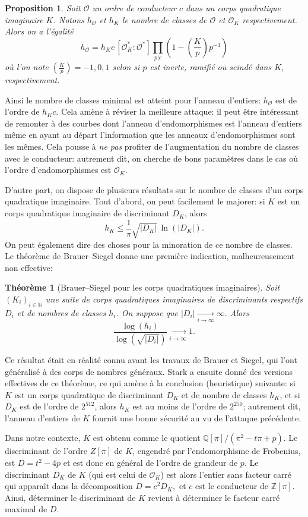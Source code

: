 \documentclass[11pt,a4paper]{article}
\newcommand{\Z}{\mathbb{Z}}
\newcommand{\N}{\mathbb{N}}
\newcommand{\Q}{\mathbb{Q}}
\renewcommand{\O}{\mathcal{O}}
\newcommand{\vers}{\longrightarrow}
\renewcommand{\v}{\vspace{5mm}}
\newtheorem*{thm}{Théorème}
\newtheorem*{prop}{Proposition}
\theoremstyle{definition}
\begin{document}
\begin{prop}
Soit $\O$ un ordre de conducteur $c$ dans un corps quadratique imaginaire $K$. Notons $h_\O$ et $h_K$ le nombre de classes de $\O$ et $\O_K$ respectivement. Alors on a l'égalité
$$h_\O = h_K c\, [\O_K^*:\O^*] \prod_{p|c} \left(1 - \left(\frac{K}{p}\right)p^{-1}\right)$$
où l'on note $\left(\frac{K}{p}\right) = -1, 0, 1$ selon si $p$ est inerte, ramifié ou scindé dans $K$, respectivement.
\end{prop}

Ainsi le nombre de classes minimal est atteint pour l'anneau d'entiers: $h_\O$ est de l'ordre de $h_K c$. Cela amène à réviser la \og meilleure attaque\fg: il peut être intéressant de remonter à des courbes dont l'anneau d'endomorphismes est l'anneau d'entiers même en ayant au départ l'information que les anneaux d'endomorphismes sont les mêmes. Cela pousse à \emph{ne pas} profiter de l'augmentation du nombre de classes avec le conducteur: autrement dit, on cherche de bons paramètres dans le cas où l'ordre d'endomorphismes est $\O_K$.

D'autre part, on dispose de plusieurs résultats sur le nombre de classes d'un corps quadratique imaginaire. Tout d'abord, on peut facilement le majorer: si $K$ est un corps quadratique imaginaire de discriminant $D_K$, alors
$$h_K \leq \frac{1}{\pi} \sqrt{|D_K|}\, \ln(|D_K|).$$
On peut également dire des choses pour la minoration de ce nombre de classes. Le théorème de Brauer--Siegel donne une première indication, malheureusement non effective:
\begin{thm}[Brauer--Siegel pour les corps quadratiques imaginaires]
Soit $(K_i)_{i\in \N}$ une suite de corps quadratiques imaginaires de discriminants respectifs $D_i$ et de nombres de classes $h_i$. On suppose que
$|D_i| \underset{i\to\infty}{\vers} \infty.$
Alors
$$\frac{\log(h_i)}{\log(\sqrt{|D_i|})} \underset{i\to\infty}{\vers} 1.$$
\end{thm}

Ce résultat était en réalité connu avant les travaux de Brauer et Siegel, qui l'ont généralisé à des corps de nombres généraux. Stark a ensuite donné des versions effectives de ce théorème, ce qui amène à la conclusion (heuristique) suivante: si $K$ est un corps quadratique de discriminant $D_K$ et de nombre de classes $h_K$, et si $D_K$ est de l'ordre de $2^{512}$, alors $h_K$ est au moins de l'ordre de $2^{250}$; autrement dit, l'anneau d'entiers de $K$ fournit une bonne sécurité au vu de l'attaque précédente.

\v
Dans notre contexte, $K$ est obtenu comme le quotient $\Q[\pi]/(\pi^2  - t\pi + p)$. Le discriminant de l'ordre $Z[\pi]$ de $K$, engendré par l'endomorphisme de Frobenius, est $D = t^2 - 4 p$ et est donc en général de l'ordre de grandeur de $p$. Le discriminant $D_K$ de $K$ (qui est celui de $\O_K$) est alors l'entier sans facteur carré qui apparaît dans la décomposition $D = c^2 D_K,$ et $c$ est le conducteur de $\Z[\pi]$. Ainsi, déterminer le discriminant de $K$ revient à déterminer le facteur carré maximal de $D$.
\end{document}
